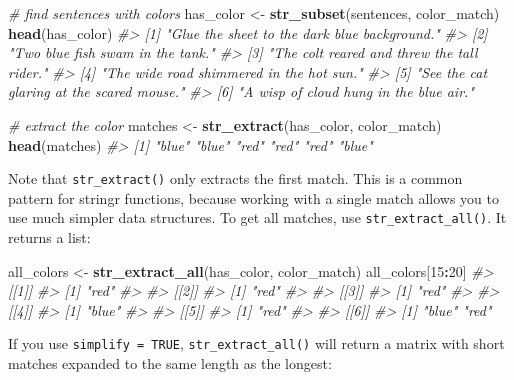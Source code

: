 \documentclass[]{book}
\newenvironment{Shaded}{\begin{snugshade}}{\end{snugshade}}
\newcommand{\KeywordTok}[1]{\textcolor[rgb]{0.13,0.29,0.53}{\textbf{#1}}}
\newcommand{\DecValTok}[1]{\textcolor[rgb]{0.00,0.00,0.81}{#1}}
\newcommand{\StringTok}[1]{\textcolor[rgb]{0.31,0.60,0.02}{#1}}
\newcommand{\CommentTok}[1]{\textcolor[rgb]{0.56,0.35,0.01}{\textit{#1}}}
\newcommand{\OperatorTok}[1]{\textcolor[rgb]{0.81,0.36,0.00}{\textbf{#1}}}
\newcommand{\NormalTok}[1]{#1}
\begin{document}
\begin{Shaded}
\begin{Highlighting}[]
\CommentTok{# find sentences with colors}
\NormalTok{has_color <-}\StringTok{ }\KeywordTok{str_subset}\NormalTok{(sentences, color_match)}
\KeywordTok{head}\NormalTok{(has_color)}
\CommentTok{#> [1] "Glue the sheet to the dark blue background."}
\CommentTok{#> [2] "Two blue fish swam in the tank."            }
\CommentTok{#> [3] "The colt reared and threw the tall rider."  }
\CommentTok{#> [4] "The wide road shimmered in the hot sun."    }
\CommentTok{#> [5] "See the cat glaring at the scared mouse."   }
\CommentTok{#> [6] "A wisp of cloud hung in the blue air."}

\CommentTok{# extract the color}
\NormalTok{matches <-}\StringTok{ }\KeywordTok{str_extract}\NormalTok{(has_color, color_match)}
\KeywordTok{head}\NormalTok{(matches)}
\CommentTok{#> [1] "blue" "blue" "red"  "red"  "red"  "blue"}
\end{Highlighting}
\end{Shaded}

Note that \texttt{str\_extract()} only extracts the first match. This is
a common pattern for stringr functions, because working with a single
match allows you to use much simpler data structures. To get all
matches, use \texttt{str\_extract\_all()}. It returns a list:

\begin{Shaded}
\begin{Highlighting}[]
\NormalTok{all_colors <-}\StringTok{ }\KeywordTok{str_extract_all}\NormalTok{(has_color, color_match)}
\NormalTok{all_colors[}\DecValTok{15}\OperatorTok{:}\DecValTok{20}\NormalTok{]}
\CommentTok{#> [[1]]}
\CommentTok{#> [1] "red"}
\CommentTok{#> }
\CommentTok{#> [[2]]}
\CommentTok{#> [1] "red"}
\CommentTok{#> }
\CommentTok{#> [[3]]}
\CommentTok{#> [1] "red"}
\CommentTok{#> }
\CommentTok{#> [[4]]}
\CommentTok{#> [1] "blue"}
\CommentTok{#> }
\CommentTok{#> [[5]]}
\CommentTok{#> [1] "red"}
\CommentTok{#> }
\CommentTok{#> [[6]]}
\CommentTok{#> [1] "blue" "red"}
\end{Highlighting}
\end{Shaded}

If you use \texttt{simplify\ =\ TRUE}, \texttt{str\_extract\_all()} will
return a matrix with short matches expanded to the same length as the
longest:
\end{document}
